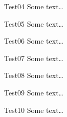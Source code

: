 \documentclass[a4paper,11pt,english]{sphinxmanual}
\let\originalchapter=\chapter
\renewcommand*{\chapter}{%
    \secdef{\Chap}{\ChapS}%
}
\newcommand\ChapS[1]{\originalchapter*{#1}%
                     \addcontentsline{toc}{chapter}{#1}%
                     \localtableofcontents
                     \cleardoublepage
}
\newcommand\Chap[2][]{\originalchapter[#1]{#2}%
                      \localtableofcontents
                      \cleardoublepage
                     }
\begin{document}
\sphinxstepscope


\chapter{Test04}
\label{\detokenize{ch04/content:test04}}\label{\detokenize{ch04/content::doc}}
\sphinxAtStartPar
Some text…

\sphinxstepscope


\chapter{Test05}
\label{\detokenize{ch05/content:test05}}\label{\detokenize{ch05/content::doc}}
\sphinxAtStartPar
Some text…

\sphinxstepscope


\chapter{Test06}
\label{\detokenize{ch06/content:test06}}\label{\detokenize{ch06/content::doc}}
\sphinxAtStartPar
Some text…

\sphinxstepscope


\chapter{Test07}
\label{\detokenize{ch07/content:test07}}\label{\detokenize{ch07/content::doc}}
\sphinxAtStartPar
Some text…

\sphinxstepscope


\chapter{Test08}
\label{\detokenize{ch08/content:test08}}\label{\detokenize{ch08/content::doc}}
\sphinxAtStartPar
Some text…

\sphinxstepscope


\chapter{Test09}
\label{\detokenize{ch09/content:test09}}\label{\detokenize{ch09/content::doc}}
\sphinxAtStartPar
Some text…

\sphinxstepscope


\chapter{Test10}
\label{\detokenize{ch10/content:test10}}\label{\detokenize{ch10/content::doc}}
\sphinxAtStartPar
Some text…
\end{document}
